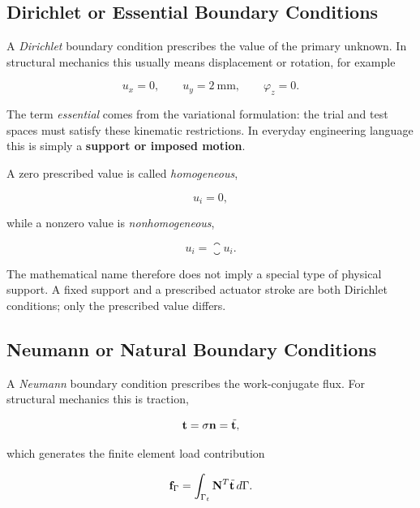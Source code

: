 \subsection{Dirichlet or Essential Boundary Conditions}

A \textit{Dirichlet} boundary condition prescribes the value of the primary
unknown. In structural mechanics this usually means displacement or rotation,
for example

\begin{equation}
    u_x=0,
    \qquad
    u_y=2\ \mathrm{mm},
    \qquad
    \varphi_z=0.
\end{equation}

The term \textit{essential} comes from the variational formulation: the trial
and test spaces must satisfy these kinematic restrictions. In everyday
engineering language this is simply a \textbf{support or imposed motion}.

A zero prescribed value is called \textit{homogeneous},

\begin{equation}
    u_i=0,
\end{equation}

while a nonzero value is \textit{nonhomogeneous},

\begin{equation}
    u_i=\closure{u}_i.
\end{equation}

The mathematical name therefore does not imply a special type of physical
support. A fixed support and a prescribed actuator stroke are both Dirichlet
conditions; only the prescribed value differs.

\subsection{Neumann or Natural Boundary Conditions}

A \textit{Neumann} boundary condition prescribes the work-conjugate flux. For
structural mechanics this is traction,

\begin{equation}
    \mathbf{t}=\mathbf{\sigma}\mathbf{n}={}\mkern3mu\overline{\mkern-3mu\mathbf{t}},
\end{equation}

which generates the finite element load contribution

\begin{equation}\label{eq:neumann-load-vector}
    \mathbf{f}_{\Gamma}
    =
    \int_{\Gamma_t}\mathbf{N}^{T}{}\mkern3mu\overline{\mkern-3mu\mathbf{t}}\,d\Gamma.
\end{equation}

